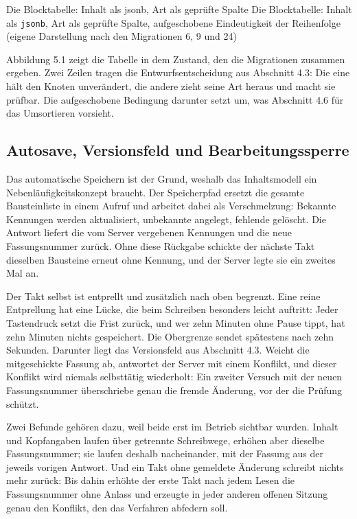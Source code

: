%
{Die Blocktabelle: Inhalt als jsonb, Art als geprüfte Spalte}%
{Die Blocktabelle: Inhalt als \texttt{jsonb}, Art als geprüfte Spalte, aufgeschobene Eindeutigkeit der Reihenfolge (eigene Darstellung nach den Migrationen 6, 9 und 24)}

Abbildung 5.1 zeigt die Tabelle in dem Zustand, den die Migrationen zusammen ergeben. Zwei Zeilen tragen die Entwurfsentscheidung aus Abschnitt 4.3: Die eine hält den Knoten unverändert, die andere zieht seine Art heraus und macht sie prüfbar. Die aufgeschobene Bedingung darunter setzt um, was Abschnitt 4.6 für das Umsortieren vorsieht.

\subsection{Autosave, Versionsfeld und Bearbeitungssperre}

Das automatische Speichern ist der Grund, weshalb das Inhaltsmodell ein Nebenläufigkeitskonzept braucht. Der Speicherpfad ersetzt die gesamte Bausteinliste in einem Aufruf und arbeitet dabei als Verschmelzung: Bekannte Kennungen werden aktualisiert, unbekannte angelegt, fehlende gelöscht. Die Antwort liefert die vom Server vergebenen Kennungen und die neue Fassungsnummer zurück. Ohne diese Rückgabe schickte der nächste Takt dieselben Bausteine erneut ohne Kennung, und der Server legte sie ein zweites Mal an.

Der Takt selbst ist entprellt und zusätzlich nach oben begrenzt. Eine reine Entprellung hat eine Lücke, die beim Schreiben besonders leicht auftritt: Jeder Tastendruck setzt die Frist zurück, und wer zehn Minuten ohne Pause tippt, hat zehn Minuten nichts gespeichert. Die Obergrenze sendet spätestens nach zehn Sekunden. Darunter liegt das Versionsfeld aus Abschnitt 4.3. Weicht die mitgeschickte Fassung ab, antwortet der Server mit einem Konflikt, und dieser Konflikt wird niemals selbsttätig wiederholt: Ein zweiter Versuch mit der neuen Fassungsnummer überschriebe genau die fremde Änderung, vor der die Prüfung schützt.

Zwei Befunde gehören dazu, weil beide erst im Betrieb sichtbar wurden. Inhalt und Kopfangaben laufen über getrennte Schreibwege, erhöhen aber dieselbe Fassungsnummer; sie laufen deshalb nacheinander, mit der Fassung aus der jeweils vorigen Antwort. Und ein Takt ohne gemeldete Änderung schreibt nichts mehr zurück: Bis dahin erhöhte der erste Takt nach jedem Lesen die Fassungsnummer ohne Anlass und erzeugte in jeder anderen offenen Sitzung genau den Konflikt, den das Verfahren abfedern soll.

